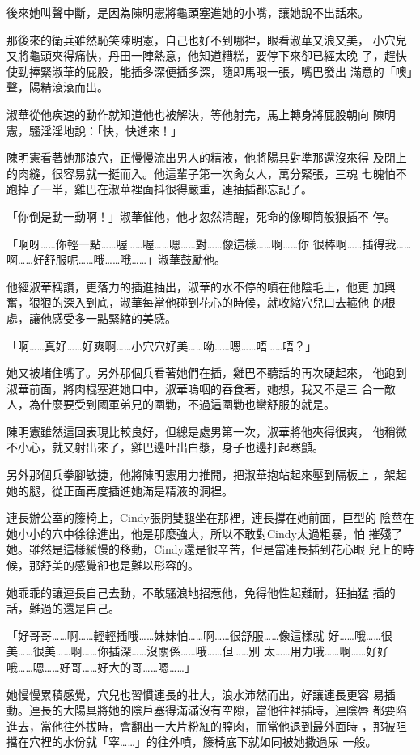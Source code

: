 後來她叫聲中斷，是因為陳明憲將龜頭塞進她的小嘴，讓她說不出話來。

那後來的衛兵雖然恥笑陳明憲，自己也好不到哪裡，眼看淑華又浪又美，
小穴兒又將龜頭夾得痛快，丹田一陣熱意，他知道糟糕，要停下來卻已經太晚
了，趕快使勁捧緊淑華的屁股，能插多深便插多深，隨即馬眼一張，嘴巴發出
滿意的「噢」聲，陽精滾滾而出。

淑華從他疾速的動作就知道他也被解決，等他射完，馬上轉身將屁股朝向
陳明憲，騷淫淫地說：「快，快進來！」

陳明憲看著她那浪穴，正慢慢流出男人的精液，他將陽具對準那還沒來得
及閉上的肉縫，很容易就一挺而入。他這輩子第一次肏女人，萬分緊張，三魂
七魄怕不跑掉了一半，雞巴在淑華裡面抖很得嚴重，連抽插都忘記了。

「你倒是動一動啊！」淑華催他，他才忽然清醒，死命的像唧筒般狠插不
停。

「啊呀……你輕一點……喔……喔……嗯……對……像這樣……啊……你
很棒啊……插得我……啊……好舒服呢……哦……哦……」淑華鼓勵他。

他經淑華稱讚，更落力的插進抽出，淑華的水不停的噴在他陰毛上，他更
加興奮，狠狠的深入到底，淑華每當他碰到花心的時候，就收縮穴兒口去箍他
的根處，讓他感受多一點緊縮的美感。

「啊……真好……好爽啊……小穴穴好美……呦……嗯……唔……唔？」

她又被堵住嘴了。另外那個兵看著她們在插，雞巴不聽話的再次硬起來，
他跑到淑華前面，將肉棍塞進她口中，淑華嗚咽的吞食著，她想，我又不是三
合一敵人，為什麼要受到國軍弟兄的圍勦，不過這圍勦也蠻舒服的就是。

陳明憲雖然這回表現比較良好，但總是處男第一次，淑華將他夾得很爽，
他稍微不小心，就又射出來了，雞巴邊吐出白漿，身子也邊打起寒顫。

另外那個兵拳腳敏捷，他將陳明憲用力推開，把淑華抱站起來壓到隔板上
，架起她的腿，從正面再度插進她滿是精液的洞裡。

連長辦公室的籐椅上，Cindy張開雙腿坐在那裡，連長撐在她前面，巨型的
陰莖在她小小的穴中徐徐進出，他是那麼強大，所以不敢對Cindy太過粗暴，怕
摧殘了她。雖然是這樣緩慢的移動，Cindy還是很辛苦，但是當連長插到花心眼
兒上的時候，那舒美的感覺卻也是難以形容的。

她乖乖的讓連長自己去動，不敢騷浪地招惹他，免得他性起難耐，狂抽猛
插的話，難過的還是自己。

「好哥哥……啊……輕輕插哦……妹妹怕……啊……很舒服……像這樣就
好……哦……很美……很美……啊……你插深……沒關係……哦……但……別
太……用力哦……啊……好好哦……嗯……好哥……好大的哥……嗯……」

她慢慢累積感覺，穴兒也習慣連長的壯大，浪水沛然而出，好讓連長更容
易插動。連長的大陽具將她的陰戶塞得滿滿沒有空隙，當他往裡插時，連陰唇
都要陷進去，當他往外拔時，會翻出一大片粉紅的膣肉，而當他退到最外面時
，那被阻擋在穴裡的水份就「窣……」的往外噴，籐椅底下就如同被她撒過尿
一般。

